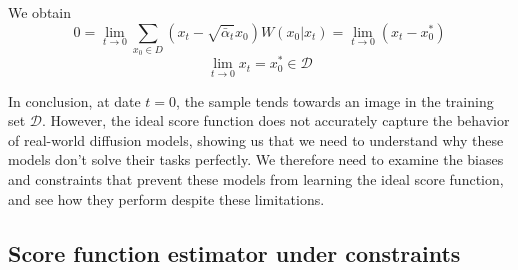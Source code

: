 \documentclass[a4paper,10pt]{article}
\begin{document}
We obtain
\[
0 = \lim\limits_{t \to 0} \sum\limits_{x_0 \in D} (x_t - \sqrt{\bar{\alpha}_t} x_0) W(x_0 | x_t) = \lim\limits_{t \to 0} (x_t - x_0^*)
\]
\begin{equation*}
    \lim\limits_{t\rightarrow 0} x_t = x_0^* \in \mathcal{D}
\end{equation*}

In conclusion, at date $t = 0$, the sample tends towards an image in the training set $\mathcal{D}$. However, the ideal score function does not accurately capture the behavior of real-world diffusion models, showing us that we need to understand why these models don't solve their tasks perfectly. We therefore need to examine the biases and constraints that prevent these models from learning the ideal score function, and see how they perform despite these limitations.
\subsection{Score function estimator under constraints}
\end{document}

